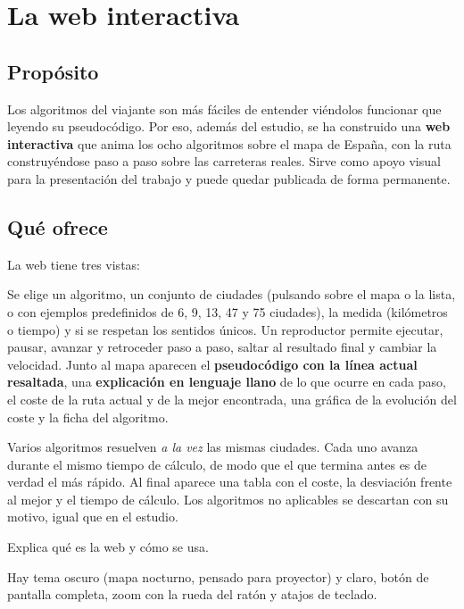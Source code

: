 \chapter{La web interactiva}\label{cap:web}

\section{Propósito}

Los algoritmos del viajante son más fáciles de entender viéndolos funcionar que leyendo su pseudocódigo. Por eso, además del estudio, se ha construido una \textbf{web interactiva} que anima los ocho algoritmos sobre el mapa de España, con la ruta construyéndose
paso a paso sobre las carreteras reales. Sirve como apoyo visual para la presentación del trabajo y puede quedar publicada de forma permanente.

\section{Qué ofrece}

La web tiene tres vistas:
\begin{description}[leftmargin=0pt,labelindent=0pt,style=nextline]
  \item[Laboratorio.] Se elige un algoritmo, un conjunto de ciudades (pulsando sobre el mapa o la lista, o con ejemplos predefinidos de 6, 9, 13, 47 y 75 ciudades), la medida (kilómetros o tiempo) y si se respetan los sentidos únicos. Un reproductor permite ejecutar, pausar, avanzar y retroceder
        paso a paso, saltar al resultado final y cambiar la velocidad. Junto al mapa aparecen el \textbf{pseudocódigo con la línea actual resaltada}, una \textbf{explicación en lenguaje llano} de lo que ocurre en cada paso, el coste de la ruta actual y de la mejor encontrada, una gráfica de la evolución del coste y la ficha del algoritmo.
  \item[Carrera.] Varios algoritmos resuelven \emph{a la vez} las mismas ciudades. Cada uno avanza durante el mismo tiempo de cálculo, de modo que el que termina antes es de verdad el más rápido. Al final aparece una tabla con el coste, la desviación frente al mejor y el tiempo de cálculo.
        Los algoritmos no aplicables se descartan con su motivo, igual que en el estudio.
  \item[Acerca de.] Explica qué es la web y cómo se usa.
\end{description}
Hay tema oscuro (mapa nocturno, pensado para proyector) y claro, botón de pantalla completa, zoom con la rueda del ratón y atajos de teclado.

